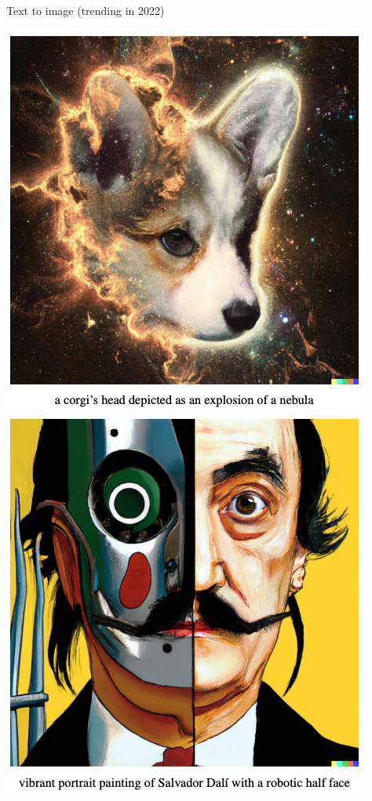 \begin{frame}{Text to image (trending in 2022)}
\begin{center}
\hspace{10mm}
\includegraphics[height=0.4\textheight]{figures/applications/dalle2_3.png}
\hspace{10mm}
\includegraphics[height=0.4\textheight]{figures/applications/dalle2_2.png}

\end{center}
\end{frame}
